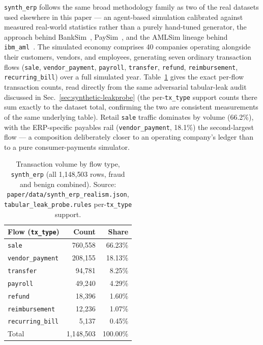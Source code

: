 \texttt{synth\_erp} follows the same broad methodology family as two of the
real datasets used elsewhere in this paper — an agent-based simulation
calibrated against measured real-world statistics rather than a purely
hand-tuned generator, the approach behind BankSim~\cite{lopezrojas2014banksim},
PaySim~\cite{lopezrojas2016paysim}, and the AMLSim lineage behind
\texttt{ibm\_aml}~\cite{altman2023realistic}. The simulated economy comprises
40 companies operating alongside their customers, vendors, and employees,
generating seven ordinary transaction flows
(\texttt{sale}, \texttt{vendor\_payment}, \texttt{payroll}, \texttt{transfer},
\texttt{refund}, \texttt{reimbursement}, \texttt{recurring\_bill}) over a full
simulated year. Table~\ref{tab:synth-flows} gives the exact per-flow
transaction counts, read directly from the same adversarial tabular-leak audit
discussed in Sec.~\ref{sec:synthetic-leakprobe} (the per-\texttt{tx\_type}
support counts there sum exactly to the dataset total, confirming the two are
consistent measurements of the same underlying table). Retail \texttt{sale}
traffic dominates by volume (66.2\%), with the ERP-specific payables rail
(\texttt{vendor\_payment}, 18.1\%) the second-largest flow — a composition
deliberately closer to an operating company's ledger than to a pure
consumer-payments simulator.

\begin{table}[t]
\centering
\small
\caption{Transaction volume by flow type, \texttt{synth\_erp} (all 1{,}148{,}503 rows, fraud and benign combined). Source: \texttt{paper/data/synth\_erp\_realism.json}, \texttt{tabular\_leak\_probe.rules} per-\texttt{tx\_type} support.}
\label{tab:synth-flows}
\begin{tabular}{@{}lrr@{}}
\toprule
Flow (\texttt{tx\_type}) & Count & Share \\
\midrule
\texttt{sale}            & 760{,}558 & 66.23\% \\
\texttt{vendor\_payment}  & 208{,}155 & 18.13\% \\
\texttt{transfer}         &  94{,}781 &  8.25\% \\
\texttt{payroll}          &  49{,}240 &  4.29\% \\
\texttt{refund}           &  18{,}396 &  1.60\% \\
\texttt{reimbursement}    &  12{,}236 &  1.07\% \\
\texttt{recurring\_bill}  &   5{,}137 &  0.45\% \\
\midrule
Total                     & 1{,}148{,}503 & 100.00\% \\
\bottomrule
\end{tabular}
\end{table}

